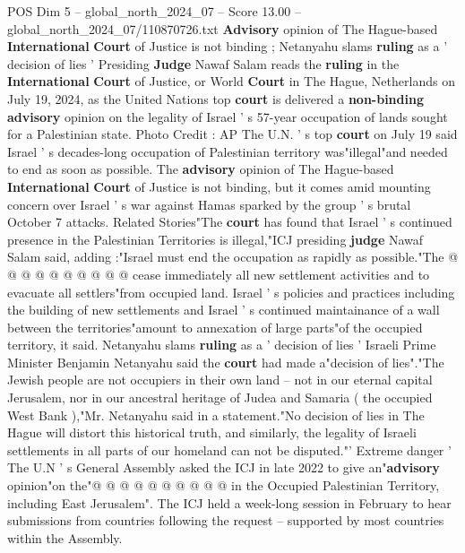 \begin{textsample}{POS Dim 5 – global\_north\_2024\_07 – Score 13.00 – global\_north\_2024\_07/110870726.txt}  \label{ex:f5_pos_308}
\textbf{Advisory} opinion of The Hague-based \textbf{International} \textbf{Court} of Justice is not binding ; Netanyahu slams \textbf{ruling} as a ' decision of lies ' Presiding \textbf{Judge} Nawaf Salam reads the \textbf{ruling} in the \textbf{International} \textbf{Court} of Justice, or World \textbf{Court} in The Hague, Netherlands on July 19, 2024, as the United Nations top \textbf{court} is delivered a \textbf{non-binding} \textbf{advisory} opinion on the legality of Israel ' s 57-year occupation of lands sought for a Palestinian state.
Photo Credit : AP The U.N. ' s top \textbf{court} on July 19 said Israel ' s decades-long occupation of Palestinian territory was"illegal"and needed to end as soon as possible.
The \textbf{advisory} opinion of The Hague-based \textbf{International} \textbf{Court} of Justice is not binding, but it comes amid mounting concern over Israel ' s war against Hamas sparked by the group ' s brutal October 7 attacks.
Related Stories"The \textbf{court} has found that Israel ' s continued presence in the Palestinian Territories is illegal,"ICJ presiding \textbf{judge} Nawaf Salam said, adding :"Israel must end the occupation as rapidly as possible."The @ @ @ @ @ @ @ @ @ @ cease immediately all new settlement activities and to evacuate all settlers"from occupied land.
Israel ' s policies and practices including the building of new settlements and Israel ' s continued maintainance of a wall between the territories"amount to annexation of large parts"of the occupied territory, it said.
Netanyahu slams \textbf{ruling} as a ' decision of lies ' Israeli Prime Minister Benjamin Netanyahu said the \textbf{court} had made a"decision of lies"."The Jewish people are not occupiers in their own land -- not in our eternal capital Jerusalem, nor in our ancestral heritage of Judea and Samaria ( the occupied West Bank ),"Mr.
Netanyahu said in a statement."No decision of lies in The Hague will distort this historical truth, and similarly, the legality of Israeli settlements in all parts of our homeland can not be disputed."' Extreme danger ' The U.N ' s General Assembly asked the ICJ in late 2022 to give an"\textbf{advisory} opinion"on the"@ @ @ @ @ @ @ @ @ @ in the Occupied Palestinian Territory, including East Jerusalem".
The ICJ held a week-long session in February to hear submissions from countries following the request -- supported by most countries within the Assembly.

\end{textsample}
